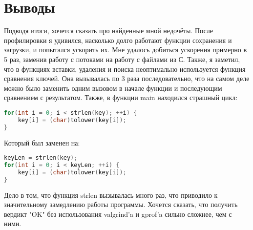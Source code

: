 \section{Выводы}

Подводя итоги, хочется сказать про найденные мной недочёты. После профилировки я удивился, насколько долго работают функции сохранения и загрузки, и попытался ускорить их. Мне удалось добиться ускорения примерно в 5 раз, заменив работу с потоками на работу с файлами из С. Также, я заметил, что в функциях вставки, удаления и поиска неоптимально используется функция сравнения ключей. Она вызывалась по 3 раза последовательно, что на самом деле можно было заменить одним вызовом в начале функции и последующим сравнением с результатом. Также, в функции main находился страшный цикл:
\begin{lstlisting}[language=C++]
for(int i = 0; i < strlen(key); ++i) {
    key[i] = (char)tolower(key[i]);
}
\end{lstlisting}
Который был заменен на:
\begin{lstlisting}[language=C++]
keyLen = strlen(key);
for(int i = 0; i < keyLen; ++i) {
    key[i] = (char)tolower(key[i]);
}
\end{lstlisting}
Дело в том, что функция strlen вызывалась много раз, что приводило к значительному замедлению работы программы. Хочется сказать, что получить вердикт "OK" без использования valgrind'a и gprof'a сильно сложнее, чем с ними. 

\pagebreak
